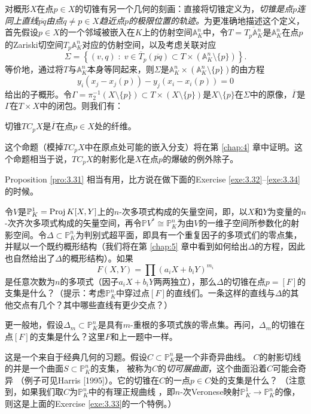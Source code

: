 对概形$X$在点$p\in X$的切锥有另一个几何的刻画：直接将切锥定义为，\textit{切锥是点$p$连同上直线$\overline{pq}$由点$q\neq p\in X$趋近点$p$的极限位置的轨迹。}为更准确地描述这个定义，首先假设$p\in X$的一个邻域被嵌入在$K$上的仿射空间$\mathbb A_K^n$中，令$T=\overline{T_p\mathbb A_K^n}$是$\mathbb A_K^n$在点$p$的Zariski切空间$T_p\mathbb A_K^n$对应的仿射空间，以及考虑关联对应
\[
	\Sigma = \left\{(v,q)\;:\;v\in \overline{T}_p(\overline{pq})\subset T\times (\mathbb A_K^n \setminus \{p\})\right\}.
\] %
等价地，通过将$T$与$\mathbb A_K^n$本身等同起来，则$\Sigma$是$\mathbb A_K^n\times (\mathbb A_K^n \setminus \{p\})$的由方程
\[
	y_i\left(x_j-x_j(p)\right)-y_j\left(x_i-x_i(p)\right)=0
\]
给出的子概形。令$\Gamma=\pi_2^{-1}(X\setminus \{p\})\subset T\times (X\setminus \{p\})$是$X\setminus \{p\}$在$\Sigma$中的原像，$\overline{\Gamma}$是$\Gamma$在$T\times X$中的闭包。则我们有：

\begin{pro}\label{pro:3.31}
切锥$TC_p X$是$\overline{\Gamma}$在点$p\in X$处的纤维。
\end{pro}

这个命题（模掉$TC_p X$中在原点处可能的嵌入分支）将在第 \ref{chap:4} 章中证明。这个命题相当于说，$TC_p X$的射影化是$X$在点$p$的爆破的例外除子。

Proposition \ref{pro:3.31} 相当有用，比方说在做下面的Exercise \ref{exe:3.32}--\ref{exe:3.34} 的时候。

\begin{exe}\label{exe:3.32}
令$V$是$\mathbb P_K^1=\operatorname{Proj} K[X,Y]$上的$n$-次多项式构成的矢量空间，即，以$X$和$Y$为变量的$n$-次齐次多项式构成的矢量空间，再令$\mathbb P V^*\cong \mathbb P_K^n$为由$V$的一维子空间所参数化的射影空间。令$\Delta\subset \mathbb P_K^n$为判别式超平面，即具有一个重复因子的多项式们的零点集，并赋以一个既约概形结构（我们将在第 \ref{chap:5} 章中看到如何给出$\Delta$的方程，因此也自然给出了$\Delta$的概形结构）。如果
\[
	F(X,Y)=\prod (a_i X+b_i Y)^{m_i}
\]
是任意次数为$n$的多项式（因子$a_iX+b_iY$两两独立），那么$\Delta$的切锥在点$p=[F]$的支集是什么？（提示：考虑$\mathbb P_K^n$中穿过点$[F]$的直线们。一条这样的直线与$\Delta$的其他交点有几个？其中哪些直线有更少交点？）
\end{exe}

\begin{exe}\label{exe:3.33}
更一般地，假设$\Delta_m\subset \mathbb P_K^n$是具有$m$-重根的多项式族的零点集。再问，$\Delta_m$的切锥在点$[F]$的支集是什么？这里$F$和上一题中一样。
\end{exe}

\begin{exe}\label{exe:3.34}
这是一个来自于经典几何的习题。假设$C\subset \mathbb P_K^n$是一个非奇异曲线。
$C$的射影切线的并是一个曲面$S\subset \mathbb P_K^n$的支集，
被称为$C$的\textit{切可展曲面}，这个曲面沿着$C$可能会奇异
（例子可见Harris [1995]）。它的切锥在$C$的一点$p\in C$处的支集是什么？
（注意到，如果我们取$C$为$\mathbb P_K^n$中的有理正规曲线%
，即$n$-次Veronese映射$\mathbb P_K^1\to\mathbb P_K^n$的像，则这是上面的Exercise \ref{exe:3.33}的一个特例。）
\end{exe}

